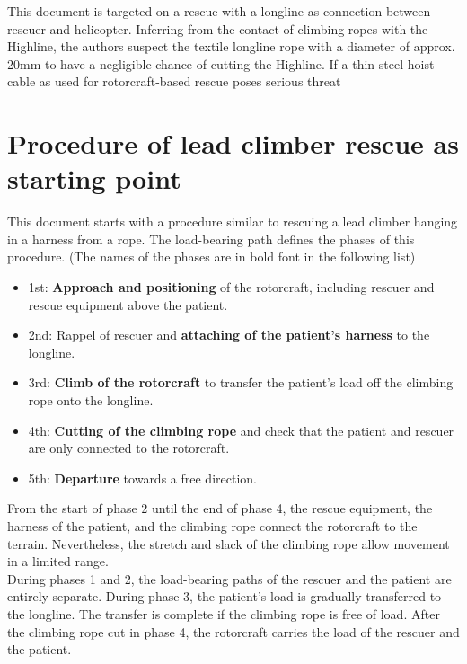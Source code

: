 \documentclass[a4paper,10pt]{scrartcl}
\begin{document}
This document is targeted on a rescue with a longline as connection between rescuer and helicopter. Inferring from the contact of climbing ropes with the Highline, the authors suspect the textile longline rope with a diameter of approx. 20mm to have a negligible chance of cutting the Highline. If a thin steel hoist cable as used for rotorcraft-based rescue poses serious threat 


\section{Procedure of lead climber rescue as starting point}
\label{sec:proc}

This document starts with a procedure similar to rescuing a lead climber hanging in a harness from a rope. The load-bearing path defines the phases of this procedure. (The names of the phases are in bold font in the following list)

\begin{itemize}
\item  1st: \textbf{Approach and positioning} of the rotorcraft, including rescuer and rescue equipment above the patient.
\item  2nd: Rappel of rescuer and \textbf{attaching of the patient's harness} to the longline.
\item 3rd: \textbf{Climb of the rotorcraft} to transfer the patient's load off the climbing rope onto the longline.
\item 4th: \textbf{Cutting of the climbing rope} and check that the patient and rescuer are only connected to the rotorcraft.
\item 5th: \textbf{Departure} towards a free direction.
\end{itemize}

From the start of phase 2 until the end of phase 4, the rescue equipment, the harness of the patient, and the climbing rope connect the rotorcraft to the terrain. Nevertheless, the stretch and slack of the climbing rope allow movement in a limited range. \\

During phases 1 and 2, the load-bearing paths of the rescuer and the patient are entirely separate. During phase 3, the patient's load is gradually transferred to the longline. The transfer is complete if the climbing rope is free of load. After the climbing rope cut in phase 4, the rotorcraft carries the load of the rescuer and the patient. \\
\end{document}
